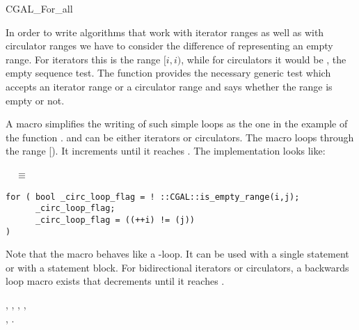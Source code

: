 
\begin{ccRefMacro}{CGAL_For_all}


\ccDefinition

In order to write algorithms that work with iterator ranges as well as
with circulator ranges we have to consider the difference of
representing an empty range. For iterators this is the range $[i,i)$,
while for circulators it would be , the empty sequence test.
The function  provides the necessary generic test
which accepts an iterator range or a circulator range and says whether
the range is empty or not.


A macro  simplifies the writing of such simple
loops as the one in the example of the function .
 and  can be either iterators or circulators. The macro
loops through the range [). It increments  until it
reaches . The implementation looks like:

  \ \ $\equiv$ \ \
\begin{minipage}[t]{0.74\textwidth}
\begin{verbatim}
for ( bool _circ_loop_flag = ! ::CGAL::is_empty_range(i,j);
      _circ_loop_flag;
      _circ_loop_flag = ((++i) != (j)) 
)
\end{verbatim}
\end{minipage}%

Note that the macro behaves like a -loop. It can be used with
a single statement or with a statement block.  For bidirectional
iterators or circulators,  a backwards loop macro
 exists that decrements  until
it reaches \ccc{i}.


\ccSeeAlso

,
,
,
,\\
,
.


\end{ccRefMacro}

